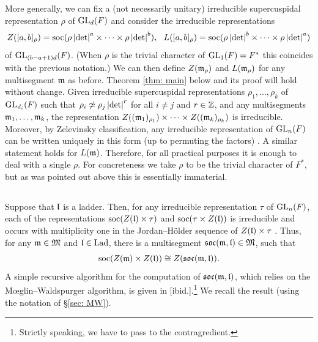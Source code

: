\documentclass{ert-l} %
\begin{document}
\begin{remark}
More generally, we can fix a (not necessarily unitary) irreducible supercuspidal representation $\rho$ of $\operatorname{GL}_d(F)$ and consider the irreducible representations
\[
Z([a,b]_{\rho})=\soc(\rho\abs{\det}^a\times\dots\times\rho\abs{\det}^b),\ \
L([a,b]_{\rho})=\soc(\rho\abs{\det}^b\times\dots\times\rho\abs{\det}^a)
\]
of $\operatorname{GL}_{(b-a+1)d}(F)$. (When $\rho$ is the trivial character of $\operatorname{GL}_1(F)=F^*$
this coincides with the previous notation.)
We can then define $Z(\mathfrak{m}_{\rho})$ and $L(\mathfrak{m}_{\rho})$ for any multisegment $\mathfrak{m}$ as before. Theorem \ref{thm: main} below and its proof will hold without change.
Given irreducible supercuspidal representations $\rho_1,\dots,\rho_k$
of $\operatorname{GL}_{d_i}(F)$ such that $\rho_i\not\simeq\rho_j\left|{\det}\right|^r$ for all
$i\ne j$ and $r\in\mathbb{Z}$, and any multisegments $\mathfrak{m}_1,\dots,\mathfrak{m}_k$,
the representation $Z((\mathfrak{m}_1)_{\rho_1})\times\dots\times Z((\mathfrak{m}_k)_{\rho_k})$
is irreducible. Moreover, by Zelevinsky classification, any irreducible representation of $\operatorname{GL}_n(F)$ can be written uniquely in this form (up to permuting the factors) \cite{MR584084}.
A similar statement holds for $L(\mathfrak{m})$. Therefore, for all practical purposes it is enough to deal with a single $\rho$.
For concreteness we take $\rho$ to be the trivial character of $F^*$, but as was pointed out above this is essentially immaterial.
\end{remark}

\subsection{}
Suppose that $\mathfrak{l}$ is a ladder.
Then, for any irreducible representation $\tau$ of $\operatorname{GL}_n(F)$, each of the representations $\operatorname{soc}(Z(\mathfrak{l})\times\tau)$
and $\operatorname{soc}(\tau\times Z(\mathfrak{l}))$ is irreducible and occurs
with multiplicity one in the Jordan--H\"older sequence of $Z(\mathfrak{l})\times\tau$ \cite{MR3573961}.
Thus, for any $\mathfrak{m}\in \mathfrak{M}$ and $\mathfrak{l}\in \operatorname{Lad}$, there is a multisegment $\mathfrak{soc}(\mathfrak{m},\mathfrak{l})\in \mathfrak{M}$, such that
\[
\operatorname{soc}(Z(\mathfrak{m})\times Z(\mathfrak{l})) \cong Z(\mathfrak{soc}(\mathfrak{m},\mathfrak{l})).
\]
A simple recursive algorithm for the computation of $\mathfrak{soc}(\mathfrak{m},\mathfrak{l})$,
which relies on the M\oe glin--Waldspurger algorithm, is given in [ibid.].\footnote{Strictly speaking,
we have to pass to the contragredient.}
We recall the result (using the notation of \S\ref{sec: MW}).
\end{document}
